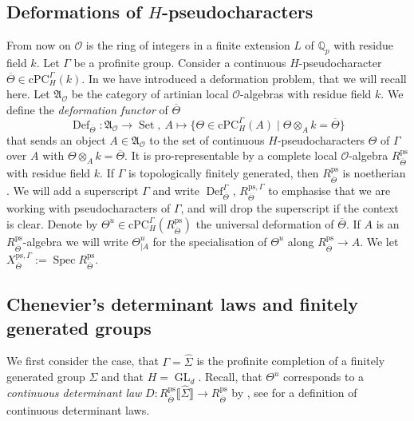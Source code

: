 \documentclass{amsart}
\theoremstyle{definition}
\theoremstyle{remark}
\DeclareMathOperator{\GL}{GL}
\DeclareMathOperator{\Spec}{Spec}
\DeclareMathOperator{\Def}{Def}
\DeclareMathOperator{\Set}{Set}
\newcommand{\Qp}{\mathbb {Q}_p}
\newcommand{\Aa}{\mathfrak A}
\newcommand{\OO}{\mathcal O}
\newcommand{\br}[1]{\llbracket #1\rrbracket}
\newcommand{\cPC}{\mathrm{cPC}}
\newcommand{\Thetabar}{\overline{\Theta}}
\newcommand{\ps}{\mathrm{ps}}
\newcommand{\Sigmahat}{\widehat{\Sigma}}
\begin{document}
\subsection{\texorpdfstring{Deformations of $H$-pseudocharacters}{Deformations of H-pseudocharacters}}\label{sec_pseudo_def} From now on $\OO$ is 
the ring of integers in a finite extension $L$ of $\Qp$ with residue field $k$.
Let $\Gamma$ be a profinite group. Consider a continuous $H$-pseudocharacter $\Thetabar \in \cPC^{\Gamma}_H(k)$.
In \cite[Section 5]{quast} we have introduced a deformation problem, that we will recall here. Let $\Aa_{\OO}$ be the category of artinian local $\OO$-algebras with residue field $k$.
We define the \emph{deformation functor} of $\Thetabar$
$$ \Def_{\Thetabar} : \Aa_{\OO} \to \Set, ~A \mapsto \{\Theta \in \cPC_H^{\Gamma}(A) \mid \Theta \otimes_A k = \Thetabar\} $$
that sends an object $A \in \Aa_{\OO}$ to the set of continuous $H$-pseudocharacters $\Theta$ of $\Gamma$ over $A$ with $\Theta \otimes_A k = \Thetabar$.
It is pro-representable by a complete local $\OO$-algebra $R^{\ps}_{\Thetabar}$ with residue field $k$.
If $\Gamma$ is topologically finitely generated, then $R^{\ps}_{\Thetabar}$ is noetherian \cite[Theorem 5.7]{quast}.
We will add a superscript $\Gamma$ and write $\Def^{\Gamma}_{\Thetabar}$, $R^{\ps, \Gamma}_{\Thetabar}$ to emphasise that  we are working with pseudocharacters of $\Gamma$, and will drop the superscript if the context is clear. 
Denote by $\Theta^u \in \cPC^{\Gamma}_H(R^{\ps}_{\Thetabar})$ the universal deformation of $\Thetabar$. If 
$A$ is an $R^{\ps}_{\Thetabar}$-algebra we will write $\Theta^u_{|A}$ for 
the specialisation of $\Theta^u$ along $R^{\ps}_{\Thetabar} \rightarrow A$. We let $X^{\ps, \Gamma}_{\Thetabar}:=\Spec R^{\ps}_{\Thetabar}$. 



\subsection{Chenevier's determinant laws and finitely generated groups}

We first consider the case, that $\Gamma = \widehat \Sigma$ is the profinite completion of a finitely generated group $\Sigma$ and that $H = \GL_d$.
Recall, that $\Theta^u$ corresponds to a \emph{continuous determinant law} 
$D : R^{\ps}_{\Thetabar}\br{\Sigmahat} \to R^{\ps}_{\Thetabar}$ by
\cite[Theorem 4.1 (ii)]{emerson2023comparison},
see \cite[Sections 1.5,  2.30]{che_durham} for a definition of continuous determinant laws.
\end{document}
